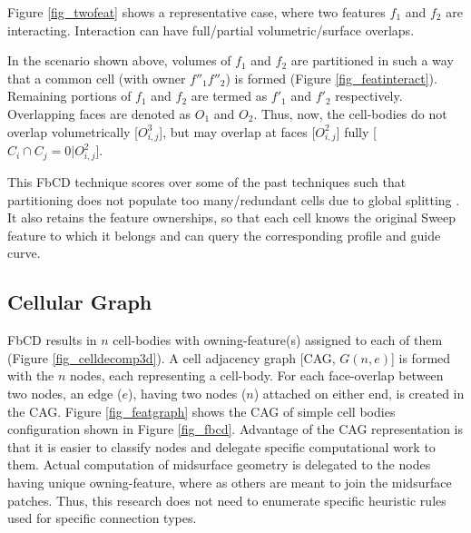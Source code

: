 Figure \ref{fig_twofeat} shows a representative case, where two features $f_1$ and $f_2$ are interacting. Interaction can have full/partial volumetric/surface overlaps. 

In the scenario shown above, volumes of $f_1$ and $f_2$ are partitioned in such a way that a common cell (with owner $f''_1f''_2$) is formed (Figure \ref{fig_featinteract}). Remaining portions of $f_1$ and $f_2$ are termed as $f'_1$ and $f'_2$ respectively.  Overlapping faces are denoted as $O_1$ and $O_2$. Thus, now, the cell-bodies do not overlap volumetrically [$O_{i,j}^3$], but may overlap at faces [$O_{i,j}^2$] fully [ $C_i \cap C_j = 0| O_{i,j}^2$].

This FbCD technique scores over some of the past techniques such that partitioning does not populate too many/redundant cells due to global splitting  \cite{Chong2004, Kageura2009, Cao2011, Woo2006, Woo2009, Boussuge2013,Boussuge2013a}. It also retains the feature ownerships, so that each cell knows the original Sweep feature to which it belongs and can query the corresponding profile and guide curve.

\subsection{Cellular Graph} \label{cagd:sec:cellulargraph}
FbCD results in $n$ cell-bodies with owning-feature(s) assigned to each of them (Figure \ref{fig_celldecomp3d}). A cell adjacency graph [CAG, $G(n,e)$] is formed with the $n$ nodes, each representing a cell-body. For each face-overlap between two nodes, an edge ($e$), having two nodes ($n$) attached on either end, is created in the CAG.  Figure \ref{fig_featgraph} shows the CAG of simple cell bodies configuration shown in Figure \ref{fig_fbcd}. Advantage of the CAG representation is that it is easier to classify nodes and delegate specific computational work to them. Actual computation of midsurface geometry is delegated to the nodes having unique owning-feature, where as others are meant to join the midsurface patches. Thus, this research does not need to enumerate specific heuristic rules used for specific connection types.


